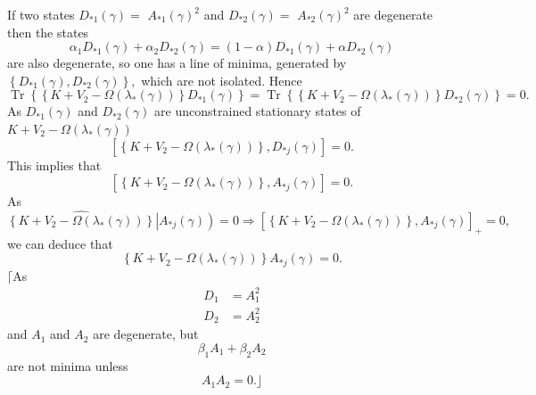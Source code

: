 \documentclass[aps,preprint]{revtex4}%
\begin{document}
If two states $D_{\ast1}\left(  \gamma\right)  =$ $A_{\ast1}\left(
\gamma\right)  ^{2}$ and $D_{\ast2}\left(  \gamma\right)  =$ $A_{\ast2}\left(
\gamma\right)  ^{2}$ are degenerate then the states
\begin{equation}
\alpha_{1}D_{\ast1}\left(  \gamma\right)  +\alpha_{2}D_{\ast2}\left(
\gamma\right)  =\left(  1-\alpha\right)  D_{\ast1}\left(  \gamma\right)
+\alpha D_{\ast2}\left(  \gamma\right)
\end{equation}
are also degenerate, so one has a line of minima, generated by $\left\{
D_{\ast1}\left(  \gamma\right)  ,D_{\ast2}\left(  \gamma\right)  \right\}  ,$
which are not isolated. Hence%
\begin{equation}
\operatorname{Tr}\left\{  \left\{  K+V_{2}-\Omega\left(  \lambda_{\ast}\left(
\gamma\right)  \right)  \right\}  D_{\ast1}\left(  \gamma\right)  \right\}
=\operatorname{Tr}\left\{  \left\{  K+V_{2}-\Omega\left(  \lambda_{\ast
}\left(  \gamma\right)  \right)  \right\}  D_{\ast2}\left(  \gamma\right)
\right\}  =0.
\end{equation}
As $D_{\ast1}\left(  \gamma\right)  $ and $D_{\ast2}\left(  \gamma\right)  $
are unconstrained stationary states of $K+V_{2}-\Omega\left(  \lambda_{\ast
}\left(  \gamma\right)  \right)  $
\begin{equation}
\left[  \left\{  K+V_{2}-\Omega\left(  \lambda_{\ast}\left(  \gamma\right)
\right)  \right\}  ,D_{\ast j}\left(  \gamma\right)  \right]  =0.
\end{equation}
This implies that
\begin{equation}
\left[  \left\{  K+V_{2}-\Omega\left(  \lambda_{\ast}\left(  \gamma\right)
\right)  \right\}  ,A_{\ast j}\left(  \gamma\right)  \right]  =0.
\end{equation}
As
\begin{equation}
\widehat{\left\{  K+V_{2}-\Omega\left(  \lambda_{\ast}\left(  \gamma\right)
\right)  \right\}  }\left\vert A_{\ast j}\left(  \gamma\right)  \right)
=0\Rightarrow\left[  \left\{  K+V_{2}-\Omega\left(  \lambda_{\ast}\left(
\gamma\right)  \right)  \right\}  ,A_{\ast j}\left(  \gamma\right)  \right]
_{+}=0,
\end{equation}
we can deduce that
\begin{equation}
\left\{  K+V_{2}-\Omega\left(  \lambda_{\ast}\left(  \gamma\right)  \right)
\right\}  A_{\ast j}\left(  \gamma\right)  =0.
\end{equation}
$\lceil$As
\begin{align}
D_{1}  &  =A_{1}^{2}\\
D_{2}  &  =A_{2}^{2}%
\end{align}
and $A_{1}$ and $A_{2}$ are degenerate, but
\begin{equation}
\beta_{1}A_{1}+\beta_{2}A_{2}%
\end{equation}
are not minima unless
\begin{equation}
A_{1}A_{2}=0.\rfloor
\end{equation}
\end{document}
